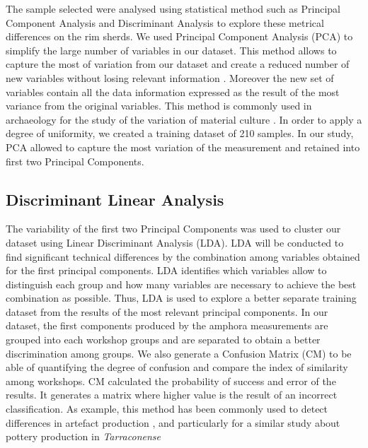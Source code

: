 \documentclass[review]{elsarticle}
\begin{document}
The sample selected were analysed using statistical method such as Principal Component Analysis and Discriminant Analysis to explore these metrical differences on the rim sherds. We used Principal Component Analysis (PCA) to simplify the large number of variables in our dataset. This method allows to capture the most of variation from our dataset and create a reduced number of new variables without losing relevant information \citep{jolliffe_principal_2002, shennan_quantifying_1997}. Moreover the new set of variables contain all the data information expressed as the result of the most variance from the original variables. This method is commonly used in archaeology for the study of the variation of material culture \citep{li_crossbows_2014, schillinger_differences_2016}. In order to apply a degree of uniformity, we created a training dataset of 210 samples. In our study, PCA allowed to capture the most variation of the measurement and retained into first two Principal Components. 


\subsection{Discriminant Linear Analysis} 

The variability of the first two Principal Components was used to cluster our dataset using Linear Discriminant Analysis (LDA). LDA will be conducted to find significant technical differences by the combination among variables obtained for the first principal components. LDA identifies which variables allow to distinguish each group and how many variables are necessary to achieve the best combination as possible. Thus, LDA is used to explore a better separate training dataset from the results of the most relevant principal components. In our dataset, the first components produced by the amphora measurements are grouped into each workshop groups and are separated to obtain a better discrimination among groups. 
We also generate a Confusion Matrix (CM) to be able of quantifying the degree of confusion and compare the index of similarity among workshops.  CM calculated the probability of success and error of the results. It generates a matrix where higher value is the result of an incorrect classification. As example, this method has been commonly used to detect differences in artefact production \citep{charlton_investigating_2012, thorpe_distribution_1984}, and particularly for a similar study about pottery production in \emph{Tarraconense} \citep{i_martin_alisis_1998}
\end{document}
